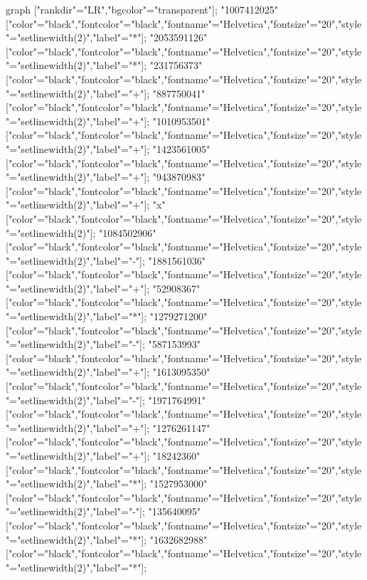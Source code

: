  {
    graph ["rankdir"="LR","bgcolor"="transparent"];
    "1007412025" ["color"="black","fontcolor"="black","fontname"="Helvetica","fontsize"="20","style"="setlinewidth(2)","label"="*"];
    "2053591126" ["color"="black","fontcolor"="black","fontname"="Helvetica","fontsize"="20","style"="setlinewidth(2)","label"="*"];
    "231756373" ["color"="black","fontcolor"="black","fontname"="Helvetica","fontsize"="20","style"="setlinewidth(2)","label"="+"];
    "887750041" ["color"="black","fontcolor"="black","fontname"="Helvetica","fontsize"="20","style"="setlinewidth(2)","label"="+"];
    "1010953501" ["color"="black","fontcolor"="black","fontname"="Helvetica","fontsize"="20","style"="setlinewidth(2)","label"="+"];
    "1423561005" ["color"="black","fontcolor"="black","fontname"="Helvetica","fontsize"="20","style"="setlinewidth(2)","label"="+"];
    "943870983" ["color"="black","fontcolor"="black","fontname"="Helvetica","fontsize"="20","style"="setlinewidth(2)","label"="+"];
    "x" ["color"="black","fontcolor"="black","fontname"="Helvetica","fontsize"="20","style"="setlinewidth(2)"];
    "1084502906" ["color"="black","fontcolor"="black","fontname"="Helvetica","fontsize"="20","style"="setlinewidth(2)","label"="-"];
    "1881561036" ["color"="black","fontcolor"="black","fontname"="Helvetica","fontsize"="20","style"="setlinewidth(2)","label"="+"];
    "52908367" ["color"="black","fontcolor"="black","fontname"="Helvetica","fontsize"="20","style"="setlinewidth(2)","label"="*"];
    "1279271200" ["color"="black","fontcolor"="black","fontname"="Helvetica","fontsize"="20","style"="setlinewidth(2)","label"="-"];
    "587153993" ["color"="black","fontcolor"="black","fontname"="Helvetica","fontsize"="20","style"="setlinewidth(2)","label"="+"];
    "1613095350" ["color"="black","fontcolor"="black","fontname"="Helvetica","fontsize"="20","style"="setlinewidth(2)","label"="-"];
    "1971764991" ["color"="black","fontcolor"="black","fontname"="Helvetica","fontsize"="20","style"="setlinewidth(2)","label"="+"];
    "1276261147" ["color"="black","fontcolor"="black","fontname"="Helvetica","fontsize"="20","style"="setlinewidth(2)","label"="+"];
    "18242360" ["color"="black","fontcolor"="black","fontname"="Helvetica","fontsize"="20","style"="setlinewidth(2)","label"="*"];
    "1527953000" ["color"="black","fontcolor"="black","fontname"="Helvetica","fontsize"="20","style"="setlinewidth(2)","label"="-"];
    "135640095" ["color"="black","fontcolor"="black","fontname"="Helvetica","fontsize"="20","style"="setlinewidth(2)","label"="*"];
    "1632682988" ["color"="black","fontcolor"="black","fontname"="Helvetica","fontsize"="20","style"="setlinewidth(2)","label"="*"];
}
